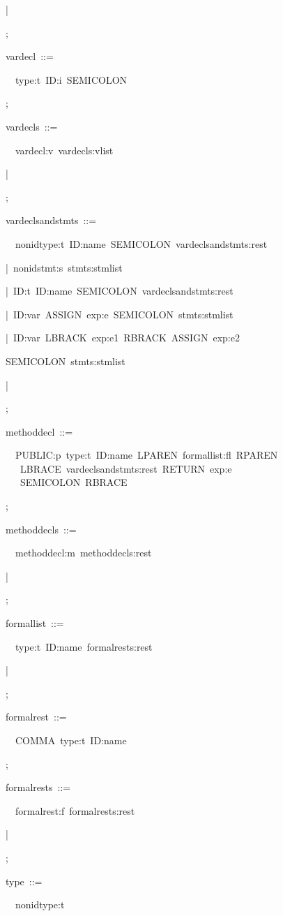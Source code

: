 \documentclass[12pt,english,twoside]{report}
\newenvironment{codeblock}
{\begin{list}{}{
\setlength{\rightmargin}{\leftmargin}
\setlength{\listparindent}{0pt}%
\raggedright
\setlength{\itemsep}{0pt}
\setlength{\parsep}{0pt}
\normalfont\ttfamily}%
 \item[]}
{\end{list}}
\begin{document}
\begin{codeblock}
\begin{codeblock}
\begin{codeblock}
|~

;
\end{codeblock}
vardecl~::=
\begin{codeblock}
~~type:t~ID:i~SEMICOLON

;
\end{codeblock}
vardecls~::=
\begin{codeblock}
~~vardecl:v~vardecls:vlist

|~

;
\end{codeblock}
vardeclsandstmts~::=
\begin{codeblock}
~~nonidtype:t~ID:name~SEMICOLON~vardeclsandstmts:rest

|~nonidstmt:s~stmts:stmlist

|~ID:t~ID:name~SEMICOLON~vardeclsandstmts:rest

|~ID:var~ASSIGN~exp:e~SEMICOLON~stmts:stmlist

|~ID:var~LBRACK~exp:e1~RBRACK~ASSIGN~exp:e2
\begin{codeblock}
SEMICOLON~stmts:stmlist
\end{codeblock}
|~

;
\end{codeblock}
methoddecl~::=
\begin{codeblock}
~~PUBLIC:p~type:t~ID:name~LPAREN~formallist:fl~RPAREN~\\
~~~LBRACE~vardeclsandstmts:rest~RETURN~exp:e~\\
~~~SEMICOLON~RBRACE

;
\end{codeblock}
methoddecls~::=
\begin{codeblock}
~~methoddecl:m~methoddecls:rest

|~

;
\end{codeblock}
formallist~::=
\begin{codeblock}
~~type:t~ID:name~formalrests:rest

|~

;
\end{codeblock}
formalrest~::=
\begin{codeblock}
~~COMMA~type:t~ID:name

;
\end{codeblock}
formalrests~::=
\begin{codeblock}
~~formalrest:f~formalrests:rest

|~

;
\end{codeblock}
type~::=
\begin{codeblock}
~~nonidtype:t


\end{codeblock}
\end{codeblock}
\end{codeblock}
\end{document}
